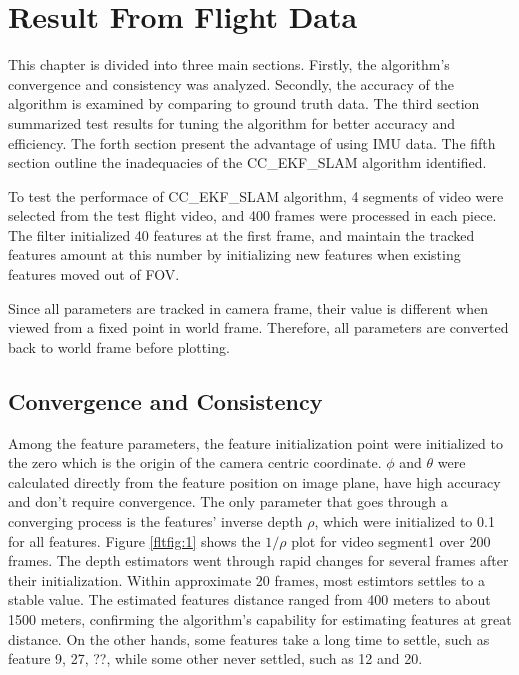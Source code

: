 \chapter{Result From Flight Data}\label{ch:FlightResult}

This chapter is divided into three main sections. Firstly, the
algorithm's convergence and consistency was analyzed. Secondly, the
accuracy of the algorithm is examined by comparing to ground truth
data. The third section summarized test results for tuning the
algorithm for better accuracy and efficiency. The forth section
present the advantage of using IMU data. The fifth section outline
the inadequacies of the CC\_EKF\_SLAM algorithm identified.

To test the performace of CC\_EKF\_SLAM algorithm, 4 segments of video
were selected from the test flight video, and 400 frames were
processed in each piece. The filter initialized 40 features at the
first frame, and maintain the tracked features amount at this number
by initializing new features when existing features moved out of FOV.

Since all parameters are tracked in camera frame, their value is 
different when viewed from a fixed point in world frame. Therefore, all 
parameters are converted back to world frame before plotting. 

\section{Convergence and Consistency}

Among the feature parameters, the feature initialization point were
initialized to the zero which is the origin of the camera centric
coordinate. $\phi$ and $\theta$ were calculated directly from the
feature position on image plane, have high accuracy and don't require
convergence. The only parameter that goes through a converging process
is the features' inverse depth $\rho$, which were initialized to 0.1
for all features. Figure \ref{fltfig:1} shows the $1/\rho$ plot for
video segment1 over 200 frames. The depth estimators went through
rapid changes for several frames after their initialization. Within
approximate 20 frames, most estimtors settles to a stable value. The
estimated features distance ranged from 400 meters to about 1500
meters, confirming the algorithm's capability for estimating features
at great distance. On the other hands, some features take a long time
to settle, such as feature 9, 27, ??, while some other never settled,
such as 12 and 20.

